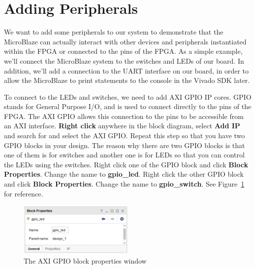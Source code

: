 \documentclass[11pt]{article}
\begin{document}
\section{Adding Peripherals}
\label{sec:add_periph}
We want to add some peripherals to our system to demonstrate that the MicroBlaze can actually interact with other devices and peripherals instantiated within the FPGA or connected to the pins of the FPGA. As a simple example, we'll connect the MicroBlaze system to the switches and LEDs of our board. In addition, we'll add a connection to the UART interface on our board, in order to allow the MicroBlaze to print statements to the console in the Vivado SDK later.

To connect to the LEDs and switches, we need to add AXI GPIO IP cores. GPIO stands for General Purpose I/O, and is used to connect directly to the pins of the FPGA. The AXI GPIO allows this connection to the pins to be accessible from an AXI interface. \textbf{Right click} anywhere in the block diagram, select \textbf{Add IP} and search for and select the  AXI GPIO. Repeat this step so that you have two GPIO blocks in your design. The reason why there are two GPIO blocks is that one of them is for switches and another one is for LEDs so that you can control the LEDs using the switches. Right click one of the GPIO block and click \textbf{Block Properties}. Change the name to \textbf{gpio\_led}. Right click the other GPIO block and click \textbf{Block Properties}. Change the name to \textbf{gpio\_switch}. See Figure~\ref{fig:gpio_prop} for reference.

\begin{figure}[h]
    \centering
    \includegraphics[width=0.5\textwidth]{images/gpio_prop.png}
    \caption{The AXI GPIO block properties window}
    \label{fig:gpio_prop}
\end{figure}
\end{document}
